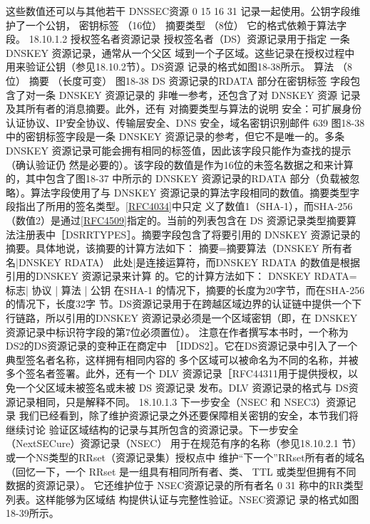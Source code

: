 这些数值还可以与其他若干 DNSSEC资源
0
15 16
31
记录一起使用。公钥字段维护了一个公钥，
密钥标签
（16位）
摘要类型
（8位）
它的格式依赖于算法字段。
18.10.1.2 授权签名者资源记录
授权签名者（DS）资源记录用于指定
一条 DNSKEY 资源记录，通常从一个父区
域到一个子区域。这些记录在授权过程中
用来验证公钥（参见18.10.2节）。DS资源
记录的格式如图18-38所示。
算法
（8位）
摘要
（长度可变）
图18-38
DS 资源记录的RDATA 部分在密钥标签
字段包含了对一条 DNSKEY 资源记录的
非唯一参考，还包含了对 DNSKEY 资源
记录及其所有者的消息摘要。此外，还有
对摘要类型与算法的说明
安全：可扩展身份认证协议、IP安全协议、传输层安全、DNS 安全，域名密钥识别邮件
639
图18-38中的密钥标签字段是一条 DNSKEY 资源记录的参考，但它不是唯一的。多条
DNSKEY 资源记录可能会拥有相同的标签值，因此该字段只能作为查找的提示（确认验证仍
然是必要的）。该字段的数值是作为16位的未签名数据之和来计算的，其中包含了图18-37
中所示的 DNSKEY 资源记录的RDATA 部分（负载被忽略）。算法字段使用了与 DNSKEY
资源记录的算法字段相同的数值。摘要类型字段指出了所用的签名类型。\href{https://www.rfc-editor.org/rfc/rfc4034}{[RFC4034]}中只定
义了数值1（SHA-1），而SHA-256（数值2）是通过\href{https://www.rfc-editor.org/rfc/rfc4509}{[RFC4509]}指定的。当前的列表包含在
DS 资源记录类型摘要算法注册表中［DSRRTYPES］。摘要字段包含了将要引用的 DNSKEY
资源记录的摘要。具体地说，该摘要的计算方法如下：
摘要=摘要算法（DNSKEY 所有者名|DNSKEY RDATA）
此处|是连接运算符，而DNSKEY RDATA 的数值是根据引用的DNSKEY 资源记录来计算
的。它的计算方法如下：
DNSKEY RDATA=标志| 协议 | 算法 | 公钥
在SHA-1 的情况下，摘要的长度为20字节，而在SHA-256 的情况下，长度32字
节。DS资源记录用于在跨越区域边界的认证链中提供一个下行链路，所以引用的DNSKEY
资源记录必须是一个区域密钥（即，在 DNSKEY 资源记录中标识符字段的第7位必须置位）。
注意在作者撰写本书时，一个称为DS2的DS资源记录的变种正在商定中
［IDDS2］。它在DS资源记录中引入了一个典型签名者名称，这样拥有相同内容的
多个区域可以被命名为不同的名称，并被多个签名者签署。此外，还有一个 DLV
资源记录［RFC44311用于提供授权，以免一个父区域未被签名或未被 DS 资源记录
发布。DLV 资源记录的格式与 DS资源记录相同，只是解释不同。
18.10.1.3 下一步安全（NSEC 和 NSEC3）资源记录
我们已经看到，除了维护资源记录之外还要保障相关密钥的安全，本节我们将继续讨论
验证区域结构的记录与其所包含的资源记录。下一步安全（NextSECure）资源记录（NSEC）
用于在规范有序的名称（参见18.10.2.1 节）或一个NS类型的RRset（资源记录集）授权点中
维护“下一个”RRset所有者的域名（回忆一下，一个 RRset 是一组具有相同所有者、类、
TTL 或类型但拥有不同数据的资源记录）。
它还维护位于 NSEC资源记录的所有者名
0
31
称中的RR类型列表。这样能够为区域结
构提供认证与完整性验证。NSEC资源记
录的格式如图 18-39所示。
